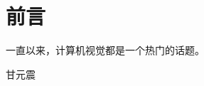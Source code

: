 \chapter*{前言}


一直以来，计算机视觉都是一个热门的话题。

\vskip 1.5cm

\begin{flushright}
甘元震\\
\releasedate
\end{flushright}
